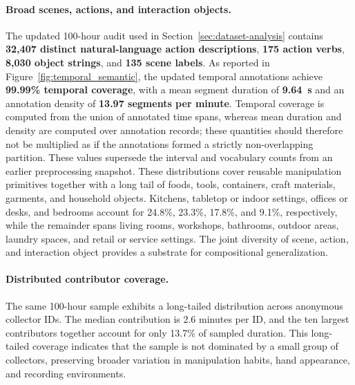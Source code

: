 \paragraph{Broad scenes, actions, and interaction objects.}
The updated 100-hour audit used in Section~\ref{sec:dataset-analysis} contains \textbf{32{,}407 distinct natural-language action descriptions}, \textbf{175 action verbs}, \textbf{8{,}030 object strings}, and \textbf{135 scene labels}.
As reported in Figure~\ref{fig:temporal_semantic}, the updated temporal annotations achieve \textbf{99.99\% temporal coverage}, with a mean segment duration of \textbf{9.64~s} and an annotation density of \textbf{13.97 segments per minute}.
Temporal coverage is computed from the union of annotated time spans, whereas mean duration and density are computed over annotation records; these quantities should therefore not be multiplied as if the annotations formed a strictly non-overlapping partition. These values supersede the interval and vocabulary counts from an earlier preprocessing snapshot.
These distributions cover reusable manipulation primitives together with a long tail of foods, tools, containers, craft materials, garments, and household objects.
Kitchens, tabletop or indoor settings, offices or desks, and bedrooms account for 24.8\%, 23.3\%, 17.8\%, and 9.1\%, respectively, while the remainder spans living rooms, workshops, bathrooms, outdoor areas, laundry spaces, and retail or service settings.
The joint diversity of scene, action, and interaction object provides a substrate for compositional generalization.

\paragraph{Distributed contributor coverage.}
The same 100-hour sample exhibits a long-tailed distribution across anonymous collector IDs. The median contribution is 2.6 minutes per ID, and the ten largest contributors together account for only 13.7\% of sampled duration.
This long-tailed coverage indicates that the sample is not dominated by a small group of collectors, preserving broader variation in manipulation habits, hand appearance, and recording environments.

